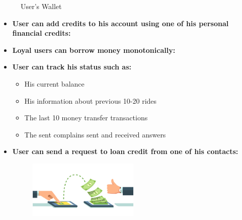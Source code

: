 \begin{enumerate}
{\begin{figure}[http]
    \caption[User's Wallet]{User's Wallet}\label{fig: order}%
 \end{figure}
}
\begin{itemize}
    \item {\textbf{User can add credits to his account using one of his personal financial credits:}}
    \item{\textbf{Loyal users can borrow money monotonically:}}

    \item{\textbf{User can track his status such as:}}
    \begin{itemize}
        \item His current balance
        \item His information about previous 10-20 rides
        \item The last 10 money transfer transactions 
         \item  The sent complains sent and received answers 
    \end{itemize}
    
    \item{\textbf{User can send a request to loan credit from one of his contacts:}}
    \begin{figure}[http]%
    \center%
    \includegraphics[width=0.5\textwidth]{images/ch2/borrower and loaner.jpg}%
    

\end{figure}
\end{itemize}
\end{enumerate}
